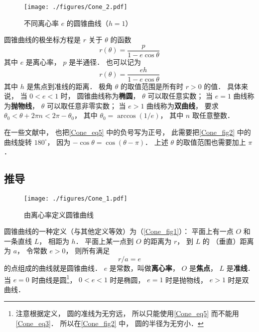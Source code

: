 

\begin{figure}[ht]
\centering
\texttt{[image: ./figures/Cone\_2.pdf]}
\caption{不同离心率 $e$ 的圆锥曲线（$h = 1$）} \label{Cone_fig2}
\end{figure}

圆锥曲线的极坐标方程是 $r$ 关于 $\theta$ 的函数
\begin{equation}\label{Cone_eq5}
r(\theta)  = \frac{p}{1 - e\cos \theta }
\end{equation}
其中 $e$ 是离心率， $p$ 是半通径． 也可以记为
\begin{equation}\label{Cone_eq3}
r(\theta) = \frac{eh}{1 - e\cos \theta }
\end{equation}
其中 $h$ 是焦点到准线的距离． 极角 $\theta$ 的取值范围是所有时 $r>0$ 的值． 具体来说， 当 $0 < e < 1$ 时， 圆锥曲线称为\textbf{椭圆}， $\theta$ 可以取任意实数； 当 $e = 1$ 曲线称为\textbf{抛物线}， $\theta$ 可以取任意非零实数； 当 $e > 1$ 曲线称为\textbf{双曲线}， 要求 $\theta_0< \theta + 2\pi n < 2\pi-\theta_0$， 其中 $\theta_0 = \arccos(1/e)$， 其中 $n$ 取任意整数．

在一些文献中， 也把\autoref{Cone_eq5} 中的负号写为正号， 此需要把\autoref{Cone_fig2} 中的曲线旋转 $180^\circ$， 因为 $-\cos\theta = \cos(\theta - \pi)$． 上述 $\theta$ 的取值范围也需要加上 $\pi$．

\subsection{推导}
\begin{figure}[ht]
\centering
\texttt{[image: ./figures/Cone\_1.pdf]}
\caption{由离心率定义圆锥曲线}\label{Cone_fig1}
\end{figure}

圆锥曲线的一种定义（与其他定义等效）为（\autoref{Cone_fig1}）：
平面上有一点 $O$ 和一条直线 $L$， 相距为 $h$． 
平面上某一点到 $O$ 的距离为 $r$， 到 $L$ 的
（垂直）距离为 $a$， 令常数 $e > 0$， 则所有满足
\begin{equation}\label{Cone_eq1}
r/a = e
\end{equation}
的点组成的曲线就是圆锥曲线． $e$ 是常数，叫做\textbf{离心率}， $O$ 是\textbf{焦点}， $L$ 是\textbf{准线}． 当 $e = 0$ 时曲线是圆\footnote{注意根据定义， 圆的准线为无穷远， 所以只能使用\autoref{Cone_eq5} 而不能用\autoref{Cone_eq3}． 所以在\autoref{Cone_fig2} 中， 圆的半径为无穷小．}， $0 < e < 1$ 时是椭圆， $e = 1$ 时是抛物线， $e > 1$ 时是双曲线．

